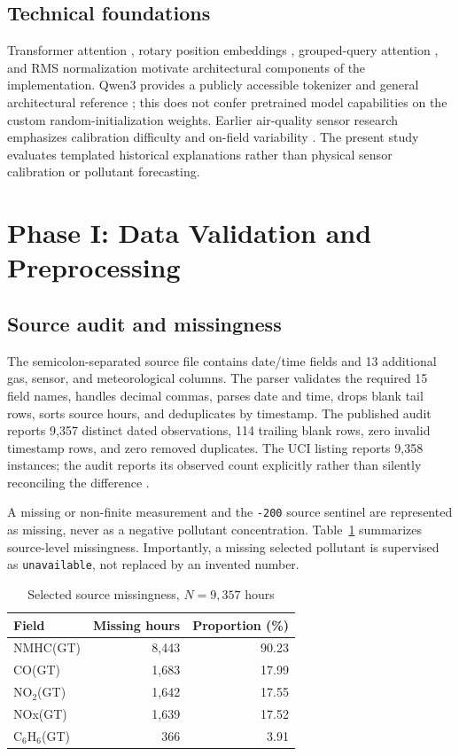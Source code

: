 \documentclass[conference,a4paper,10pt]{IEEEtran}
\begin{document}
\subsection{Technical foundations}
Transformer attention \cite{vaswani}, rotary position embeddings \cite{roformer}, grouped-query attention \cite{gqa}, and RMS normalization \cite{rmsnorm} motivate architectural components of the implementation. Qwen3 provides a publicly accessible tokenizer and general architectural reference \cite{qwen}; this does not confer pretrained model capabilities on the custom random-initialization weights. Earlier air-quality sensor research emphasizes calibration difficulty and on-field variability \cite{devito}. The present study evaluates templated historical explanations rather than physical sensor calibration or pollutant forecasting.

\section{Phase I: Data Validation and Preprocessing}
\subsection{Source audit and missingness}
The semicolon-separated source file contains date/time fields and 13 additional gas, sensor, and meteorological columns. The parser validates the required 15 field names, handles decimal commas, parses date and time, drops blank tail rows, sorts source hours, and deduplicates by timestamp. The published audit reports 9,357 distinct dated observations, 114 trailing blank rows, zero invalid timestamp rows, and zero removed duplicates. The UCI listing reports 9,358 instances; the audit reports its observed count explicitly rather than silently reconciling the difference \cite{uci}.

A missing or non-finite measurement and the \texttt{-200} source sentinel are represented as missing, never as a negative pollutant concentration. Table~\ref{tab:missing} summarizes source-level missingness. Importantly, a missing selected pollutant is supervised as \texttt{unavailable}, not replaced by an invented number.

\begin{table}[t]
\centering
\caption{Selected source missingness, $N=9{,}357$ hours}
\label{tab:missing}
\begin{tabular}{lrr}
\toprule
Field & Missing hours & Proportion (\%)\\
\midrule
NMHC(GT) & 8,443 & 90.23\\
CO(GT) & 1,683 & 17.99\\
NO$_2$(GT) & 1,642 & 17.55\\
NOx(GT) & 1,639 & 17.52\\
C$_6$H$_6$(GT) & 366 & 3.91\\
\bottomrule
\end{tabular}
\end{table}
\end{document}

